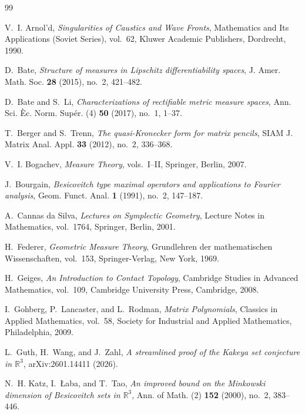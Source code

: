 \documentclass[10pt]{article}
\begin{document}
\begin{thebibliography}{99}

V.~I. Arnol'd,
\emph{Singularities of Caustics and Wave Fronts},
Mathematics and Its Applications (Soviet Series), vol.~62,
Kluwer Academic Publishers, Dordrecht, 1990.

D.~Bate,
\emph{Structure of measures in Lipschitz differentiability spaces},
J. Amer. Math. Soc. \textbf{28} (2015), no.~2, 421--482.

D.~Bate and S.~Li,
\emph{Characterizations of rectifiable metric measure spaces},
Ann. Sci. \`Ec. Norm. Sup\'er. (4) \textbf{50} (2017), no.~1, 1--37.

T.~Berger and S.~Trenn,
\emph{The quasi-Kronecker form for matrix pencils},
SIAM J. Matrix Anal. Appl. \textbf{33} (2012), no.~2, 336--368.

V.~I. Bogachev,
\emph{Measure Theory}, vols.~I--II,
Springer, Berlin, 2007.

J.~Bourgain,
\emph{Besicovitch type maximal operators and applications to Fourier analysis},
Geom. Funct. Anal. \textbf{1} (1991), no.~2, 147--187.

A.~Cannas da Silva,
\emph{Lectures on Symplectic Geometry},
Lecture Notes in Mathematics, vol.~1764, Springer, Berlin, 2001.

H.~Federer,
\emph{Geometric Measure Theory},
Grundlehren der mathematischen Wissenschaften, vol.~153,
Springer-Verlag, New York, 1969.

H.~Geiges,
\emph{An Introduction to Contact Topology},
Cambridge Studies in Advanced Mathematics, vol.~109,
Cambridge University Press, Cambridge, 2008.

I.~Gohberg, P.~Lancaster, and L.~Rodman,
\emph{Matrix Polynomials},
Classics in Applied Mathematics, vol.~58,
Society for Industrial and Applied Mathematics, Philadelphia, 2009.

L.~Guth, H.~Wang, and J.~Zahl,
\emph{A streamlined proof of the Kakeya set conjecture in \(\mathbb R^3\)},
arXiv:2601.14411 (2026).

N.~H. Katz, I.~\L aba, and T.~Tao,
\emph{An improved bound on the Minkowski dimension of Besicovitch sets in
\(\mathbb R^3\)},
Ann. of Math. (2) \textbf{152} (2000), no.~2, 383--446.


\end{thebibliography}
\end{document}
